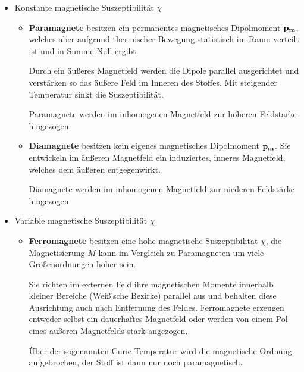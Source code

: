 \documentclass[a4paper, 11pt, ngerman, parskip=half-]{scrartcl}
\begin{document}
\begin{itemize}
    \item Konstante magnetische Suszeptibilität $\chi$

          \begin{itemize}
              \item \textbf{Paramagnete} besitzen ein permanentes magnetisches Dipolmoment
                    $\bold{p_m}$, welches aber aufgrund thermischer Bewegung statistisch im Raum
                    verteilt ist und in Summe Null ergibt.

                    Durch ein äußeres Magnetfeld werden die Dipole parallel ausgerichtet und verstärken
                    so das äußere Feld im Inneren des Stoffes. Mit steigender Temperatur sinkt die
                    Suszeptibilität.

                    Paramagnete werden im inhomogenen Magnetfeld zur höheren Feldstärke hingezogen.

              \item \textbf{Diamagnete} besitzen kein eigenes magnetisches Dipolmoment $\bold{p_m}$.
                    Sie entwickeln im  äußeren Magnetfeld ein induziertes, inneres Magnetfeld, welches
                    dem äußeren entgegenwirkt.

                    Diamagnete werden im inhomogenen Magnetfeld zur niederen Feldstärke hingezogen.
          \end{itemize}

    \item Variable magnetische Suszeptibilität $\chi$

          \begin{itemize}
              \item \textbf{Ferromagnete} besitzen eine hohe magnetische Suszeptibilität $\chi$, die
                    Magnetisierung $M$ kann im Vergleich zu Paramagneten um viele Größenordnungen höher
                    sein.

                    Sie richten im externen Feld ihre magnetischen Momente innerhalb kleiner Bereiche
                    (Weiß'sche Bezirke) parallel aus und behalten diese Ausrichtung auch nach Entfernung
                    des Feldes. Ferromagnete erzeugen entweder selbst ein dauerhaftes Magnetfeld oder
                    werden von einem Pol eines äußeren Magnetfelds stark angezogen.

                    Über der sogenannten Curie-Temperatur wird die magnetische Ordnung aufgebrochen,
                    der Stoff ist dann nur noch paramagnetisch.


\end{itemize}
\end{itemize}
\end{document}
